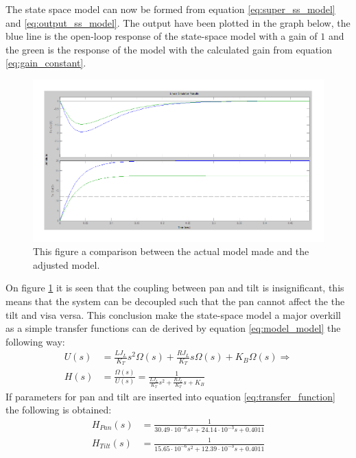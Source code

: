 The state space model can now be formed from equation \ref{eq:super_ss_model} and \ref{eq:output_ss_model}. The output have been plotted in the graph below, the blue line is the open-loop response of the state-space model with a gain of $1$ and the green is the response of the model with the calculated gain from equation \ref{eq:gain_constant}.
\begin{figure}[htb]
	\begin{center}
	\includegraphics[scale=1,trim=0 0 0 0]{graphics/ZoomOpenLoop.pdf} %
	\caption{This figure a comparison between the actual model made and the adjusted model.}
	\label{fig:zoom_step}			%
	\end{center}
\end{figure}
On figure \ref{fig:zoom_step} it is seen that the coupling between pan and tilt is insignificant, this means that the system can be decoupled such that the pan cannot affect the the tilt and visa versa. This conclusion make the state-space model a major overkill as a simple transfer functions can de derived by equation \ref{eq:model_model} the following way:
\begin{align}
	U(s) &= \frac{L J_L}{K_T} s^2 \Omega(s) + \frac{R J_L}{K_T} s \Omega(s) + K_B \Omega(s) \Rightarrow\\
	H(s) &= \frac{\Omega(s)}{U(s)} = \frac{1}{\frac{L J_L}{K_T} s^2 + \frac{R J_L}{K_T} s + K_B}\label{eq:transfer_function}
\end{align}
If parameters for pan and tilt are inserted into equation \ref{eq:transfer_function} the following is obtained:
\begin{align}
	H_{Pan}(s) &= \frac{1}{30.49 \cdot 10^{-6} s^2 + 24.14 \cdot 10^{-3} s + 0.4011}\label{eq:transfer_function_pan}\\
	H_{Tilt}(s) &= \frac{1}{15.65 \cdot 10^{-6} s^2 + 12.39 \cdot 10^{-3} s + 0.4011}\label{eq:transfer_function_tilt}
\end{align}

